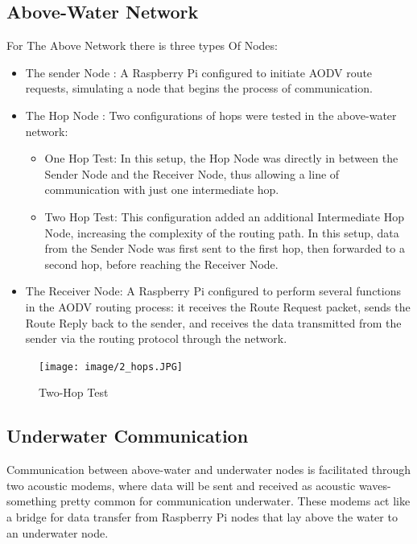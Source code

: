 \documentclass[]{nsm-thesis}
\begin{document}
\subsection{Above-Water Network}
For The Above Network there is three types Of Nodes:
\begin{itemize}
    \item The sender Node : A Raspberry Pi configured to initiate AODV route requests, simulating a node that begins the process of communication.
    
    \item The Hop Node : Two configurations of hops were tested in the above-water network:
        \begin{itemize}
            \item One Hop Test: In this setup, the Hop Node was directly in between the Sender Node and the Receiver Node, thus allowing a line of communication with just one intermediate hop. 
            \item Two Hop Test: This configuration added an additional Intermediate Hop Node, increasing the complexity of the routing path. In this setup, data from the Sender Node was first sent to the first hop, then forwarded to a second hop, before reaching the Receiver Node.
        \end{itemize}
    \item The Receiver Node: A Raspberry Pi configured to perform several functions in the AODV routing process: it receives the Route Request packet, sends the Route Reply back to the sender, and receives the data transmitted from the sender via the routing protocol through the network.
    
\end{itemize}
\begin{figure}[h!]
    \centering
    \texttt{[image: image/2\_hops.JPG]}
    \caption{Two-Hop Test}
    \label{fig:example0}
\end{figure}

\subsection{Underwater Communication}
Communication between above-water and underwater nodes is facilitated through two acoustic modems, where data will be sent and received as acoustic waves-something pretty common for communication underwater. These modems act like a bridge for data transfer from Raspberry Pi nodes that lay above the water to an underwater node.
\end{document}
